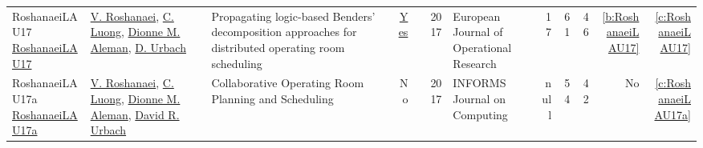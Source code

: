 {\begin{longtable}{>{\raggedright\arraybackslash}p{3cm}>{\raggedright\arraybackslash}p{6cm}>{\raggedright\arraybackslash}p{6.5cm}rrrp{2.5cm}rrrrr}
RoshanaeiLAU17 \href{http://dx.doi.org/10.1016/j.ejor.2016.08.024}{RoshanaeiLAU17} & \hyperref[auth:a737]{V. Roshanaei}, \hyperref[auth:a946]{C. Luong}, \hyperref[auth:a913]{Dionne M. Aleman}, \hyperref[auth:a947]{D. Urbach} & Propagating logic-based Benders' decomposition approaches for distributed operating room scheduling & \href{../works/RoshanaeiLAU17.pdf}{Yes} & \cite{RoshanaeiLAU17} & 2017 & European Journal of Operational Research & 17 & 61 & 46 & \ref{b:RoshanaeiLAU17} & \ref{c:RoshanaeiLAU17}\\
RoshanaeiLAU17a \href{http://dx.doi.org/10.1287/ijoc.2017.0745}{RoshanaeiLAU17a} & \hyperref[auth:a737]{V. Roshanaei}, \hyperref[auth:a946]{C. Luong}, \hyperref[auth:a913]{Dionne M. Aleman}, \hyperref[auth:a914]{David R. Urbach} & Collaborative Operating Room Planning and Scheduling & No & \cite{RoshanaeiLAU17a} & 2017 & INFORMS Journal on Computing & null & 54 & 42 & No & \ref{c:RoshanaeiLAU17a}\\
\end{longtable}
}

\clearpage
